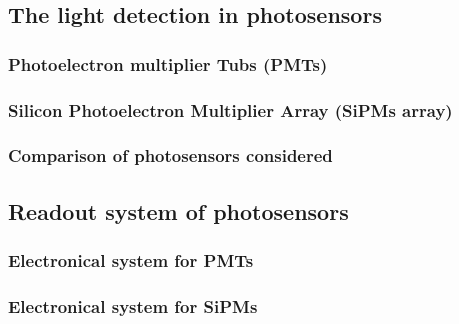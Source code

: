\documentclass[12pt,a4paper]{book}
\begin{document}
		\subsection{The light detection in photosensors}\label{subsec:Photosensors}
		
	
			\subsubsection{Photoelectron multiplier Tubs (PMTs)}\label{subsubsec:PMTs}
			
		
			\subsubsection{Silicon Photoelectron Multiplier Array (SiPMs array)}\label{subsubsec:SiPM}
			
			
			\subsubsection[Comparison photosensors]{Comparison of photosensors considered}\label{subsubsec:ComparisonPhotosensors}
			
			\newpage
					
		\subsection{Readout system of photosensors}\label{subsec:Electronic}\label{subsec:IntroductionHemos hablado ElectronicalSystem}
			
	
			\subsubsection[Electronical system for PMTs]{Electronical system for PMTs}\label{subsubsec:PMTsElectronicalSystem}
			
			
			\subsubsection[Electronical system for a SiPM]{Electronical system for SiPMs}\label{subsubsec:SiPMsElectronicalSystem}
			
			\newpage		
		
\end{document}
